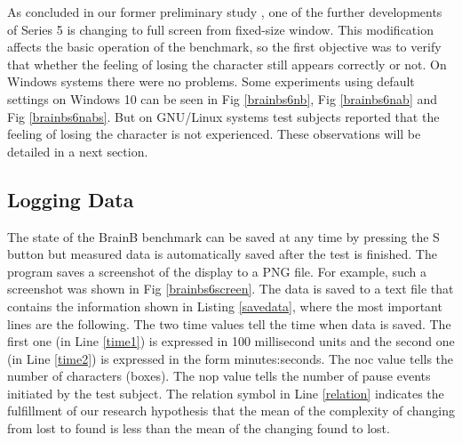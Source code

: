 \documentclass[a4paper]{article}
\begin{document}
As concluded in our former preliminary study \cite{brainbs5}, one of the further developments of Series 5 is changing to full screen from fixed-size window. This modification affects the basic operation of the benchmark, 
so the first objective was to verify that whether the feeling of losing the character still appears correctly or not. On Windows systems there were no problems. Some experiments using default settings on Windows 10 can be seen in Fig \ref{brainbs6nb}, Fig \ref{brainbs6nab} and Fig \ref{brainbs6nabs}. But on GNU/Linux systems test subjects reported that the feeling of losing the character is not experienced. These observations will be detailed in a next section.





\subsection{Logging Data}

The state of the BrainB benchmark can be saved at any time by pressing the S button but measured data is automatically saved after the test is finished. The program saves a screenshot of the display to a PNG file. For example, such a screenshot was shown in Fig \ref{brainbs6screen}. The data is saved to a text file that contains the information shown in Listing \ref{savedata}, where the most important lines are the following. 
The two time values tell the time when data is saved. The first one (in Line \ref{time1}) 
is expressed in 100 millisecond units and the second one (in Line \ref{time2}) is expressed in the form minutes:seconds. 
The noc value tells the number of characters (boxes).
The nop value tells the number of pause events initiated by the test subject.
The relation symbol in Line \ref{relation} indicates the fulfillment of our research hypothesis that 
the mean of the complexity of changing from lost to found is less than the mean of the changing found to lost. 
\end{document}
